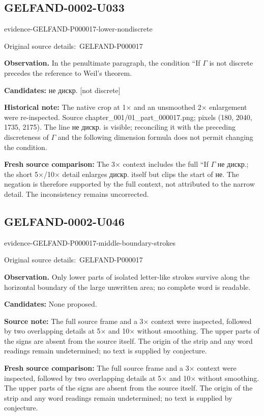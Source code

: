 \documentclass[11pt]{article}
\newcommand{\EvidenceBlock}[4]{%
 \par\smallskip\noindent\begin{minipage}{\linewidth}
 \begin{minipage}[t]{.47\linewidth}\vspace{0pt}\centering
 \csname evidence-#1-#2\endcsname\par
 {\scriptsize\SourceCropCaption\ #1}\par
 \end{minipage}\hfill
 \begin{minipage}[t]{.49\linewidth}\vspace{0pt}\raggedright
 {\small\color{orange!65!black}\textbf{#4} #3}\par
 \end{minipage}
 \end{minipage}\par\smallskip}
\newcommand{\SourceCropCaption}{Original source details:}\newcommand{\ReadingCaption}{Uncertain reading.}\newcommand{\IncompleteCaption}{Undeciphered passage.}\newcommand{\DiagramCaption}{Diagram and typed description.}
\begin{document}
\subsection*{GELFAND-0002-U033}
\EvidenceBlock{GELFAND-P000017}{lower-nondiscrete}{In the penultimate paragraph, the condition ``If \(\Gamma\) is not discrete precedes the reference to Weil’s theorem.}{Observation.}
\par\smallskip\noindent\textbf{Candidates: } не дискр. [not discrete]\par
\par\smallskip\noindent\textbf{Historical note: } The native crop at 1× and an unsmoothed 2× enlargement were re-inspected. Source chapter\_001/01\_part\_000017.png; pixels (180, 2040, 1735, 2175). The line не дискр. is visible; reconciling it with the preceding discreteness of \(\Gamma\) and the following dimension formula does not permit changing the condition.\par
\par\smallskip\noindent\textbf{Fresh source comparison: } The 3× context includes the full ``If \(\Gamma\) не дискр.; the short 5×/10× detail enlarges дискр. itself but clips the start of не. The negation is therefore supported by the full context, not attributed to the narrow detail. The inconsistency remains uncorrected.\par


\subsection*{GELFAND-0002-U046}
\EvidenceBlock{GELFAND-P000017}{middle-boundary-strokes}{Only lower parts of isolated letter-like strokes survive along the horizontal boundary of the large unwritten area; no complete word is readable.}{Observation.}
\par\smallskip\noindent\textbf{Candidates: } None proposed.\par
\par\smallskip\noindent\textbf{Source note: } The full source frame and a 3× context were inspected, followed by two overlapping details at 5× and 10× without smoothing. The upper parts of the signs are absent from the source itself. The origin of the strip and any word readings remain undetermined; no text is supplied by conjecture.\par
\par\smallskip\noindent\textbf{Fresh source comparison: } The full source frame and a 3× context were inspected, followed by two overlapping details at 5× and 10× without smoothing. The upper parts of the signs are absent from the source itself. The origin of the strip and any word readings remain undetermined; no text is supplied by conjecture.\par
\end{document}
